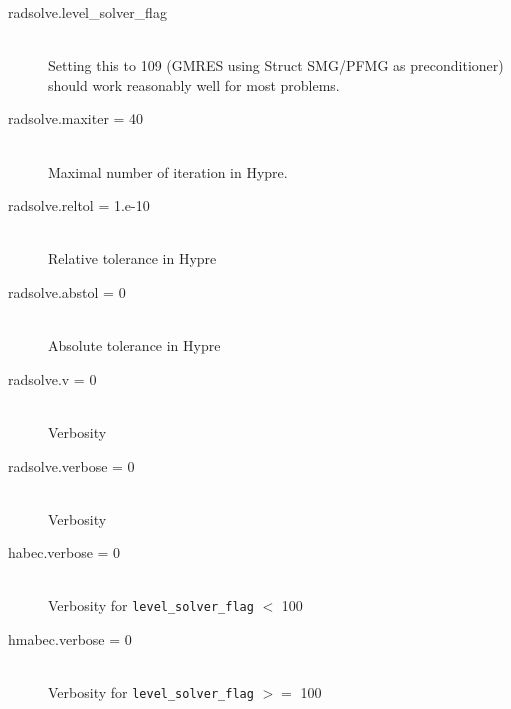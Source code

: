 \documentclass[11pt,letterpaper]{article}
\begin{document}
\begin{description}
\item[radsolve.level\_solver\_flag] \hfill \\
  Setting this to 109 (GMRES using Struct SMG/PFMG as preconditioner)
  should work reasonably well for most problems. 
\item[radsolve.maxiter = 40] \hfill \\
  Maximal number of iteration in Hypre.
\item[radsolve.reltol = 1.e-10] \hfill \\
  Relative tolerance in Hypre
\item[radsolve.abstol = 0] \hfill \\
  Absolute tolerance in Hypre
\item[radsolve.v = 0] \hfill \\
  Verbosity
\item[radsolve.verbose = 0] \hfill \\
  Verbosity
\item[habec.verbose = 0] \hfill \\
  Verbosity for {\tt level\_solver\_flag} $<$ 100
\item[hmabec.verbose = 0] \hfill \\
  Verbosity for {\tt level\_solver\_flag} $>=$ 100
\end{description}
\end{document}
